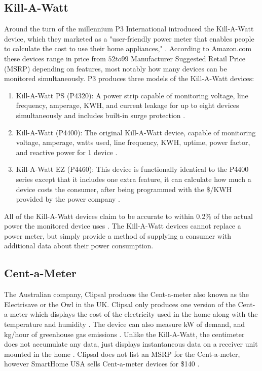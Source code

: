 \subsection{Kill-A-Watt} %
Around the turn of the millennium P3 International introduced the Kill-A-Watt device, which they marketed as a "user-friendly power meter that enables people to calculate the cost to use their home appliances," \cite{About_P3}. According to Amazon.com these devices range in price from $52 to $99 Manufacturer Suggested Retail Price (MSRP) depending on features, most notably how many devices can be monitored simultaneously. P3 produces three models of the Kill-A-Watt devices:
\begin{enumerate}
\item Kill-A-Watt PS (P4320): A power strip capable of monitoring voltage, line frequency, amperage, KWH, and current leakage for up to eight devices simultaneously and includes built-in surge protection \cite{P4320_Datasheet}.
\item Kill-A-Watt (P4400): The original Kill-A-Watt device, capable of monitoring voltage, amperage, watts used, line frequency, KWH, uptime, power factor, and reactive power for 1 device \cite{P4400_Datasheet}.
\item Kill-A-Watt EZ (P4460): This device is functionally identical to the P4400 series except that it includes one extra feature, it can calculate how much a device costs the consumer, after being programmed with the \$/KWH provided by the power company \cite{P4460_Datasheet}.
\end{enumerate}
All of the Kill-A-Watt devices claim to be accurate to within 0.2\% of the actual power the monitored device uses \cite{P4320_Datasheet}\cite{P4400_Datasheet}\cite{P4460_Datasheet}. The Kill-A-Watt devices cannot replace a power meter, but simply provide a method of supplying a consumer with additional data about their power consumption.

\subsection{Cent-a-Meter} %
The Australian company, Clipsal produces the Cent-a-meter also known as the Electrisave or the Owl in the UK. Clipsal only produces one version of the Cent-a-meter which displays the cost of the electricity used in the home along with the temperature and humidity \cite{Clipsal_CentAMeter}. The device can also measure kW of demand, and kg/hour of greenhouse gas emissions \cite{SmartHomeUSA}. Unlike the Kill-A-Watt, the centimeter does not accumulate any data, just displays instantaneous data on a receiver unit mounted in the home \cite{Clipsal_CentAMeter}. Clipsal does not list an MSRP for the Cent-a-meter, however SmartHome USA sells Cent-a-meter devices for \$140 \cite{SmartHomeUSA}.

